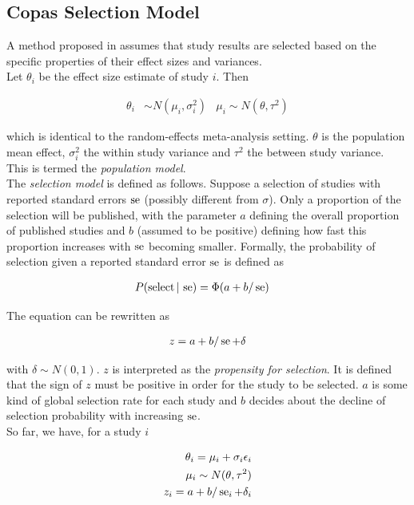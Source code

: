 \documentclass[11pt,a4paper,twoside]{book}\usepackage[]{graphicx}\usepackage[]{color}
\begin{document}
\subsection{Copas Selection Model} \label{sec:copas}

A method proposed in \cite{Copas1,Copas2,Copas3} assumes that study results are selected based on the specific properties of their effect sizes and variances. \\
Let $\theta_i$ be the effect size estimate of study $i$. Then 

\begin{align}
\theta_i &\sim N(\mu_i, \sigma_i^2) &
\mu_i \sim N(\theta, \tau^2) \label{eq:population.model}
\end{align}

which is identical to the random-effects meta-analysis setting. $\theta$ is the population mean effect, $\sigma_i^2$ the within study variance and $\tau^2$ the between study variance. This is termed the \textit{population model}. \\
The \textit{selection model} is defined as follows. Suppose a selection of studies with reported %
standard errors $\operatorname{se}$ (possibly different from $\sigma$). Only a proportion of the selection will be published, with the parameter $a$ defining the overall proportion of published studies and $b$ (assumed to be positive) defining how fast this proportion increases with $\operatorname{se}$ becoming smaller. Formally, the probability of selection given a reported standard error $\operatorname{se}$ is defined as

\begin{align}
P(\textrm{select}\given \se) &= \Phi(a + b/\se) \nonumber %
\end{align}

The equation can be rewritten as 

\begin{align}
z = a + b/\se + \delta \nonumber %
\end{align}

with $\delta \sim N(0,1)$. $z$ is interpreted as the \textit{propensity for selection}. It is defined that the sign of $z$ must be positive in order for the study to be selected.
$a$ is some kind of global selection rate for each study and $b$ decides about the decline of selection probability with increasing $\operatorname{se}$.\\
So far, we have, for a study $i$

\begin{align}
\theta_i = \mu_i + \sigma_i\epsilon_i \nonumber \\ 
\mu_i \sim N(\theta, \tau^2) \nonumber \\
z_i = a + b/\operatorname{se}_i + \delta_i \nonumber
\end{align}
\end{document}
